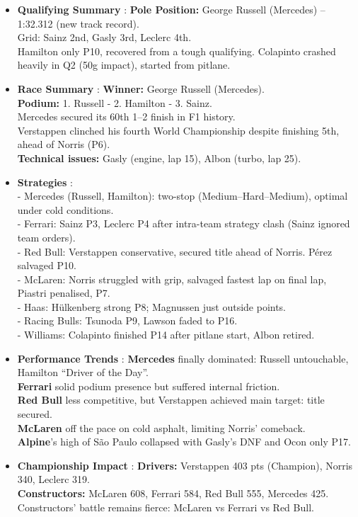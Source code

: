 \begin{itemize}
    \item \textbf{Qualifying Summary} : \textbf{Pole Position:} George Russell (Mercedes) – 1:32.312 (new track record). \\
    Grid: Sainz 2nd, Gasly 3rd, Leclerc 4th. \\
    Hamilton only P10, recovered from a tough qualifying. Colapinto crashed heavily in Q2 (50g impact), started from pitlane.
    
    \item \textbf{Race Summary} : \textbf{Winner:} George Russell (Mercedes). \\
    \textbf{Podium:} 1. Russell - 2. Hamilton - 3. Sainz. \\
    Mercedes secured its 60th 1–2 finish in F1 history. \\
    Verstappen clinched his fourth World Championship despite finishing 5th, ahead of Norris (P6). \\
    \textbf{Technical issues:} Gasly (engine, lap 15), Albon (turbo, lap 25).
    
    \item \textbf{Strategies} : \\
    - Mercedes (Russell, Hamilton): two-stop (Medium–Hard–Medium), optimal under cold conditions. \\
    - Ferrari: Sainz P3, Leclerc P4 after intra-team strategy clash (Sainz ignored team orders). \\
    - Red Bull: Verstappen conservative, secured title ahead of Norris. Pérez salvaged P10. \\
    - McLaren: Norris struggled with grip, salvaged fastest lap on final lap, Piastri penalised, P7. \\
    - Haas: Hülkenberg strong P8; Magnussen just outside points. \\
    - Racing Bulls: Tsunoda P9, Lawson faded to P16. \\
    - Williams: Colapinto finished P14 after pitlane start, Albon retired.
    
    \item \textbf{Performance Trends} : \textbf{Mercedes} finally dominated: Russell untouchable, Hamilton “Driver of the Day”. \\
    \textbf{Ferrari} solid podium presence but suffered internal friction. \\
    \textbf{Red Bull} less competitive, but Verstappen achieved main target: title secured. \\
    \textbf{McLaren} off the pace on cold asphalt, limiting Norris’ comeback. \\
    \textbf{Alpine}’s high of São Paulo collapsed with Gasly’s DNF and Ocon only P17.
    
    \item \textbf{Championship Impact} : \textbf{Drivers:} Verstappen 403 pts (Champion), Norris 340, Leclerc 319. \\
    \textbf{Constructors:} McLaren 608, Ferrari 584, Red Bull 555, Mercedes 425. \\
    Constructors’ battle remains fierce: McLaren vs Ferrari vs Red Bull.
\end{itemize}

